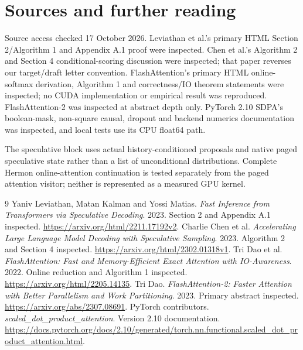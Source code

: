 \chapter*{Sources and further reading}
Source access checked 17 October 2026. Leviathan et al.'s primary HTML
Section 2/Algorithm 1 and Appendix A.1 proof were inspected. Chen et al.'s
Algorithm 2 and Section 4 conditional-scoring discussion were inspected;
that paper reverses our target/draft letter convention. FlashAttention's
primary HTML online-softmax derivation, Algorithm 1 and correctness/IO
theorem statements were inspected; no CUDA implementation or empirical
result was reproduced. FlashAttention-2 was inspected at abstract depth only.
PyTorch 2.10 SDPA's boolean-mask, non-square causal, dropout and backend
numerics documentation was inspected, and local tests use its CPU float64 path.

The speculative block uses actual history-conditioned proposals and native paged speculative state rather than a list of unconditional distributions. Complete
Hermon online-attention continuation is tested separately from the paged
attention visitor; neither is represented as a measured GPU kernel.

\begin{thebibliography}{9}
 Yaniv Leviathan, Matan Kalman and Yossi Matias.
\emph{Fast Inference from Transformers via Speculative Decoding}. 2023.
Section 2 and Appendix A.1 inspected.
\url{https://arxiv.org/html/2211.17192v2}.
 Charlie Chen et al.
\emph{Accelerating Large Language Model Decoding with Speculative Sampling}.
2023. Algorithm 2 and Section 4 inspected.
\url{https://arxiv.org/html/2302.01318v1}.
 Tri Dao et al.
\emph{FlashAttention: Fast and Memory-Efficient Exact Attention with
IO-Awareness}. 2022. Online reduction and Algorithm 1 inspected.
\url{https://arxiv.org/html/2205.14135}.
 Tri Dao.
\emph{FlashAttention-2: Faster Attention with Better Parallelism and Work
Partitioning}. 2023. Primary abstract inspected.
\url{https://arxiv.org/abs/2307.08691}.
 PyTorch contributors.
\emph{scaled\_dot\_product\_attention}. Version 2.10 documentation.
\url{https://docs.pytorch.org/docs/2.10/generated/torch.nn.functional.scaled_dot_product_attention.html}.
\end{thebibliography}
